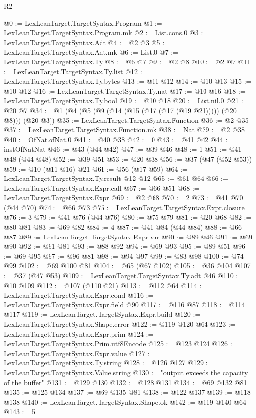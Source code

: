 \begin{lexlean}{R2}
\begin{coremodule}
@0 := LexLeanTarget.TargetSyntax.Program
@1 := LexLeanTarget.TargetSyntax.Program.mk
@2 := List.cons.{0}
@3 := LexLeanTarget.TargetSyntax.Adt
@4 := @2 @3
@5 := LexLeanTarget.TargetSyntax.Adt.mk
@6 := List.{0}
@7 := LexLeanTarget.TargetSyntax.Ty
@8 := @6 @7
@9 := @2 @8
@10 := @2 @7
@11 := LexLeanTarget.TargetSyntax.Ty.list
@12 := LexLeanTarget.TargetSyntax.Ty.bytes
@13 := @11 @12
@14 := @10 @13
@15 := @10 @12
@16 := LexLeanTarget.TargetSyntax.Ty.nat
@17 := @10 @16
@18 := LexLeanTarget.TargetSyntax.Ty.bool
@19 := @10 @18
@20 := List.nil.{0}
@21 := @20 @7
@34 := @1 (@4 (@5 (@9 (@14 (@15 (@17 (@17 (@19 @21))))) (@20 @8))) (@20 @3))
@35 := LexLeanTarget.TargetSyntax.Function
@36 := @2 @35
@37 := LexLeanTarget.TargetSyntax.Function.mk
@38 := Nat
@39 := @2 @38
@40 := OfNat.ofNat.{0}
@41 := @40 @38
@42 := 0
@43 := @41 @42
@44 := instOfNatNat
@46 := @43 (@44 @42)
@47 := @39 @46
@48 := 1
@51 := @41 @48 (@44 @48)
@52 := @39 @51
@53 := @20 @38
@56 := @37 (@47 (@52 @53))
@59 := @10 (@11 @16) @21
@61 := @56 (@17 @59)
@64 := LexLeanTarget.TargetSyntax.Ty.result @12 @12
@65 := @61 @64
@66 := LexLeanTarget.TargetSyntax.Expr.call
@67 := @66 @51
@68 := LexLeanTarget.TargetSyntax.Expr
@69 := @2 @68
@70 := 2
@73 := @41 @70 (@44 @70)
@74 := @66 @73
@75 := LexLeanTarget.TargetSyntax.Expr.closure
@76 := 3
@79 := @41 @76 (@44 @76)
@80 := @75 @79
@81 := @20 @68
@82 := @80 @81
@83 := @69 @82
@84 := 4
@87 := @41 @84 (@44 @84)
@88 := @66 @87
@89 := LexLeanTarget.TargetSyntax.Expr.var
@90 := @89 @46
@91 := @69 @90
@92 := @91 @81
@93 := @88 @92
@94 := @69 @93
@95 := @89 @51
@96 := @69 @95
@97 := @96 @81
@98 := @94 @97
@99 := @83 @98
@100 := @74 @99
@102 := @69 @100 @81
@104 := @65 (@67 @102)
@105 := @36 @104
@107 := @37 (@47 @53)
@109 := LexLeanTarget.TargetSyntax.Ty.adt @46
@110 := @10 @109
@112 := @107 (@110 @21)
@113 := @112 @64
@114 := LexLeanTarget.TargetSyntax.Expr.cond
@116 := LexLeanTarget.TargetSyntax.Expr.field @90
@117 := @116 @87
@118 := @114 @117
@119 := LexLeanTarget.TargetSyntax.Expr.build
@120 := LexLeanTarget.TargetSyntax.Shape.error
@122 := @119 @120 @64
@123 := LexLeanTarget.TargetSyntax.Expr.prim
@124 := LexLeanTarget.TargetSyntax.Prim.utf8Encode
@125 := @123 @124
@126 := LexLeanTarget.TargetSyntax.Expr.value
@127 := LexLeanTarget.TargetSyntax.Ty.string
@128 := @126 @127
@129 := LexLeanTarget.TargetSyntax.Value.string
@130 := "output exceeds the capacity of the buffer"
@131 := @129 @130
@132 := @128 @131
@134 := @69 @132 @81
@135 := @125 @134
@137 := @69 @135 @81
@138 := @122 @137
@139 := @118 @138
@140 := LexLeanTarget.TargetSyntax.Shape.ok
@142 := @119 @140 @64
@143 := 5

\end{coremodule}
\end{lexlean}
